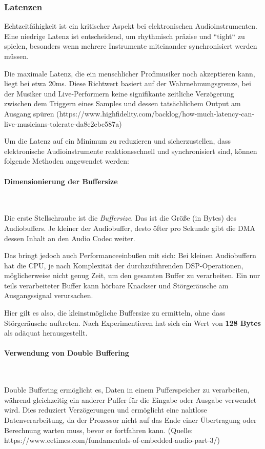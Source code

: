 \subsubsection{Latenzen}



Echtzeitfähigkeit ist ein kritischer Aspekt bei elektronischen Audioinstrumenten. 
Eine niedrige Latenz ist entscheidend, um rhythmisch präzise und ``tight`` zu spielen, besonders wenn mehrere Instrumente miteinander synchronisiert werden müssen.

Die maximale Latenz, die ein menschlicher Profimusiker noch akzeptieren kann, liegt bei etwa 20ms. Diese Richtwert basiert auf der Wahrnehmungsgrenze, bei der Musiker und Live-Performern keine signifikante zeitliche Verzögerung zwischen dem Triggern eines Samples und dessen tatsächlichem Output am Ausgang spüren (https://www.highfidelity.com/backlog/how-much-latency-can-live-musicians-tolerate-da8e2ebe587a)

Um die Latenz auf ein Minimum zu reduzieren und sicherzustellen, dass elektronische Audioinstrumente reaktionsschnell und synchronisiert sind, können folgende Methoden angewendet werden:

\paragraph{Dimensionierung der Buffersize}\

Die erste Stellschraube ist die \textit{Buffersize}.
Das ist die Größe (in Bytes) des Audiobuffers.
Je kleiner der Audiobuffer, desto öfter pro Sekunde gibt die DMA dessen Inhalt an den Audio Codec weiter.

Das bringt jedoch auch Performanceeinbußen mit sich: Bei kleinen Audiobuffern hat die CPU, je nach Komplexität der durchzuführenden DSP-Operationen, möglicherweise nicht genug Zeit, um den gesamten Buffer zu verarbeiten.
Ein nur teils verarbeiteter Buffer kann hörbare Knackser und Störgeräusche am Ausgangssignal verursachen.

Hier gilt es also, die kleinstmögliche Buffersize zu ermitteln, ohne dass Störgeräusche auftreten.
Nach Experimentieren hat sich ein Wert von \textbf{128 Bytes} als adäquat herausgestellt.

\paragraph{Verwendung von Double Buffering}\

Double Buffering ermöglicht es, Daten in einem Pufferspeicher zu verarbeiten, während gleichzeitig ein anderer Puffer für die Eingabe oder Ausgabe verwendet wird. Dies reduziert Verzögerungen und ermöglicht eine nahtlose Datenverarbeitung, da der Prozessor nicht auf das Ende einer Übertragung oder Berechnung warten muss, bevor er fortfahren kann. (Quelle: https://www.eetimes.com/fundamentals-of-embedded-audio-part-3/)

